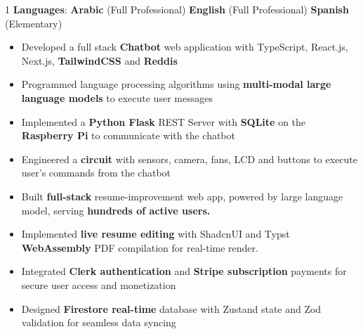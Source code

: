 \documentclass[11pt,a4paper,ragged2e]{altacv}
\begin{document}
\begin{paracol}{1}
\textbf{Languages}:  \textbf{Arabic} (Full Professional) \hfill \textbf{English} (Full Professional) \hfill \textbf{Spanish} (Elementary)

\medskip

\begin{itemize}
  \item Developed a full stack \textbf{Chatbot} web application with TypeScript, React.js, Next.js, \textbf{TailwindCSS} and \textbf{Reddis}
  \item Programmed language processing algorithms using \textbf{multi-modal large language models} to execute user messages
  \item Implemented a \textbf{Python Flask} REST Server with \textbf{SQLite} on the \textbf{Raspberry Pi} to communicate with the chatbot
  \item Engineered a \textbf{circuit} with sensors, camera, fans, LCD and buttons to execute user's commands from the chatbot 
  \end{itemize}

  \medskip



\begin{itemize}
\item Built \textbf{full-stack} resume-improvement web app, powered by large language model, serving \textbf{hundreds of active users.}
\item Implemented \textbf{live resume editing} with ShadcnUI and Typst \textbf{WebAssembly} PDF compilation for real-time render.
\item Integrated \textbf{Clerk authentication} and \textbf{Stripe subscription} payments for secure user access and monetization
\item Designed \textbf{Firestore real-time} database with Zustand state and Zod validation for seamless data syncing
\end{itemize}
\tightdivider


\end{paracol}
\end{document}
